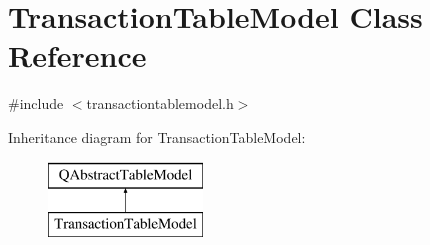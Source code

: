 \hypertarget{class_transaction_table_model}{}\section{Transaction\+Table\+Model Class Reference}
\label{class_transaction_table_model}


{\ttfamily \#include $<$transactiontablemodel.\+h$>$}

Inheritance diagram for Transaction\+Table\+Model\+:\begin{figure}[H]
\begin{center}
\leavevmode
\includegraphics[height=2.000000cm]{class_transaction_table_model}
\end{center}
\end{figure}
